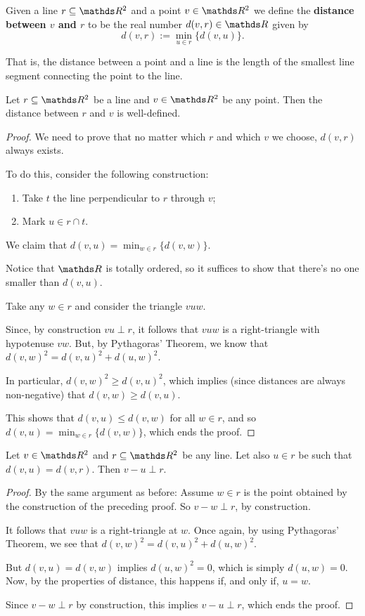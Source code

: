 \begin{df}
	Given a line $r\subseteq \R^2$ and a point $v\in \R^2$ we define the \textbf{distance between $v$ and $r$} to be the real number $d(v,r)\in\R$ given by
	\[d(v,r):=\min_{u\in r}\{d(v,u)\}.\]
	
	That is, the distance between a point and a line is the length of the smallest line segment connecting the point to the line.
\end{df}

\begin{lemma}
	Let $r\subseteq \R^2$ be a line and $v\in \R^2$ be any point. Then the distance between $r$ and $v$ is well-defined.
\end{lemma}
\begin{proof}
	We need to prove that no matter which $r$ and which $v$ we choose, $d(v,r)$ always exists.
	
	To do this, consider the following construction:
	
	\begin{enumerate}[(i.)]
		\item Take $t$ the line perpendicular to $r$ through $v$;
		\item Mark $u\in r\cap t$.
	\end{enumerate}

	We claim that $d(v,u)=\min_{w\in r}\{d(v,w)\}$.
	
	Notice that $\R$ is totally ordered, so it suffices to show that there's no one smaller than $d(v,u)$.
	
	Take any $w\in r$ and consider the triangle $vuw$.
	
	Since, by construction $vu\perp r$, it follows that $vuw$ is a right-triangle with hypotenuse $vw$. But, by Pythagoras' Theorem, we know that $d(v,w)^2=d(v,u)^2+d(u,w)^2$.
	
	In particular, $d(v,w)^2\geq d(v,u)^2$, which implies (since distances are always non-negative) that $d(v,w)\geq d(v,u)$.
	
	This shows that $d(v,u)\leq d(v,w)$ for all $w\in r$, and so $d(v,u)=\min_{w\in r}\{d(v,w)\}$, which ends the proof.
\end{proof}
\begin{cor}
	Let $v\in \R^2$ and $r\subseteq \R^2$ be any line. Let also $u\in r$ be such that $d(v,u)=d(v,r)$. Then $v-u\perp r$.
\end{cor}
\begin{proof}
	By the same argument as before: Assume $w\in r$ is the point obtained by the construction of the preceding proof. So $v-w\perp r$, by construction.
	
	It follows that $vuw$ is a right-triangle at $w$. Once again, by using Pythagoras' Theorem, we see that $d(v,w)^2=d(v,u)^2+d(u,w)^2$.
	
	But $d(v,u)=d(v,w)$ implies $d(u,w)^2=0$, which is simply $d(u,w)=0$. Now, by the properties of distance, this happens if, and only if, $u=w$.
	
	Since $v-w\perp r$ by construction, this implies $v-u\perp r$, which ends the proof.
\end{proof}

